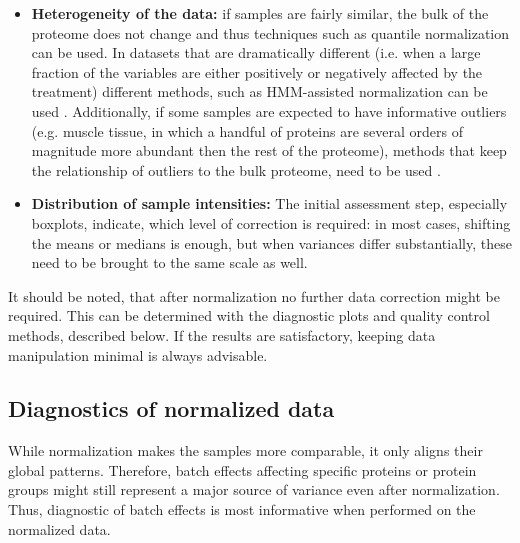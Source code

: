 \documentclass[num-refs]{wiley-article}
\begin{document}
\begin{itemize}
    \item \textbf{Heterogeneity of the data: }if samples are fairly similar, the bulk of the proteome does not change and thus techniques such as quantile normalization \cite{Bolstad2003} can be used. In datasets that are dramatically different (i.e. when a large fraction of the variables are either positively or negatively affected by the treatment) different methods, such as HMM-assisted normalization can be used \cite{Landfors2011}. Additionally, if some samples are expected to have informative outliers (e.g. muscle tissue, in which a handful of proteins are several orders of magnitude more abundant then the rest of the proteome), methods that keep the relationship of outliers to the bulk proteome, need to be used \cite{Wang770115}.

    \item \textbf{Distribution of sample intensities: }The initial assessment step, especially boxplots, indicate, which level of correction is required: in most cases, shifting the means or medians is enough, but when variances differ substantially, these need to be brought to the same scale as well.
\end{itemize}
It should be noted, that after normalization no further data correction might be required. This can be determined with the diagnostic plots and quality control methods, described below. If the results are satisfactory, keeping data manipulation minimal is always advisable.

\subsection{Diagnostics of normalized data}

While normalization makes the samples more comparable, it only aligns their global patterns. Therefore, batch effects affecting specific proteins or protein groups might still represent a major source of variance even after normalization. Thus, diagnostic of batch effects is most informative when performed on the normalized data. 
\end{document}
